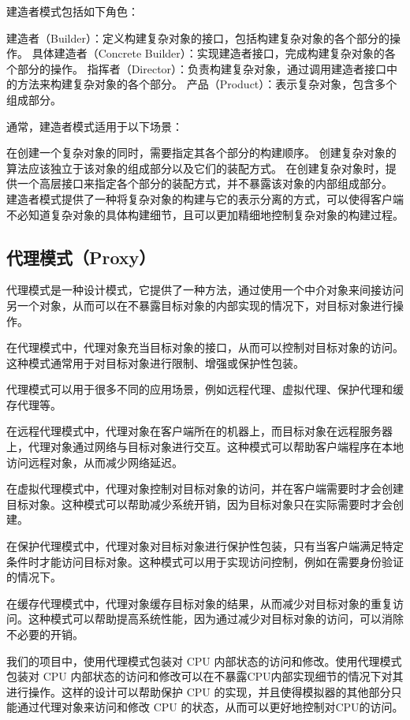 \documentclass[cn,black,12pt,normal]{elegantnote}
\begin{document}
建造者模式包括如下角色：

建造者（Builder）：定义构建复杂对象的接口，包括构建复杂对象的各个部分的操作。
具体建造者（Concrete Builder）：实现建造者接口，完成构建复杂对象的各个部分的操作。
指挥者（Director）：负责构建复杂对象，通过调用建造者接口中的方法来构建复杂对象的各个部分。
产品（Product）：表示复杂对象，包含多个组成部分。

通常，建造者模式适用于以下场景：

在创建一个复杂对象的同时，需要指定其各个部分的构建顺序。
创建复杂对象的算法应该独立于该对象的组成部分以及它们的装配方式。
在创建复杂对象时，提供一个高层接口来指定各个部分的装配方式，并不暴露该对象的内部组成部分。
建造者模式提供了一种将复杂对象的构建与它的表示分离的方式，可以使得客户端不必知道复杂对象的具体构建细节，且可以更加精细地控制复杂对象的构建过程。


\subsection{代理模式（Proxy）}

代理模式是一种设计模式，它提供了一种方法，通过使用一个中介对象来间接访问另一个对象，从而可以在不暴露目标对象的内部实现的情况下，对目标对象进行操作。

在代理模式中，代理对象充当目标对象的接口，从而可以控制对目标对象的访问。这种模式通常用于对目标对象进行限制、增强或保护性包装。

代理模式可以用于很多不同的应用场景，例如远程代理、虚拟代理、保护代理和缓存代理等。

在远程代理模式中，代理对象在客户端所在的机器上，而目标对象在远程服务器上，代理对象通过网络与目标对象进行交互。这种模式可以帮助客户端程序在本地访问远程对象，从而减少网络延迟。

在虚拟代理模式中，代理对象控制对目标对象的访问，并在客户端需要时才会创建目标对象。这种模式可以帮助减少系统开销，因为目标对象只在实际需要时才会创建。

在保护代理模式中，代理对象对目标对象进行保护性包装，只有当客户端满足特定条件时才能访问目标对象。这种模式可以用于实现访问控制，例如在需要身份验证的情况下。

在缓存代理模式中，代理对象缓存目标对象的结果，从而减少对目标对象的重复访问。这种模式可以帮助提高系统性能，因为通过减少对目标对象的访问，可以消除不必要的开销。

我们的项目中，使用代理模式包装对 CPU 内部状态的访问和修改。使用代理模式包装对 CPU 内部状态的访问和修改可以在不暴露CPU内部实现细节的情况下对其进行操作。这样的设计可以帮助保护 CPU 的实现，并且使得模拟器的其他部分只能通过代理对象来访问和修改 CPU 的状态，从而可以更好地控制对CPU的访问。
\end{document}
